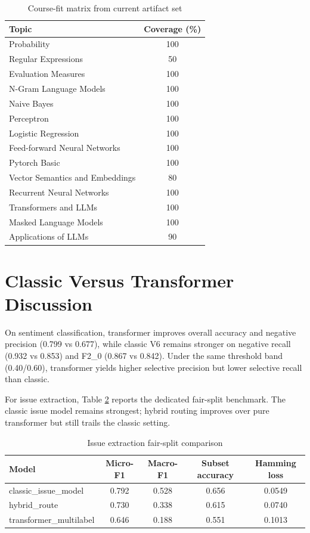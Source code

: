 \documentclass[12pt,a4paper]{article}
\begin{document}
\begin{table}[H]
\centering
\caption{Course-fit matrix from current artifact set}
\label{tab:course_fit}
\begin{tabular}{lc}
\toprule
Topic & Coverage (\%) \\
\midrule
Probability & 100 \\
Regular Expressions & 50 \\
Evaluation Measures & 100 \\
N-Gram Language Models & 100 \\
Naive Bayes & 100 \\
Perceptron & 100 \\
Logistic Regression & 100 \\
Feed-forward Neural Networks & 100 \\
Pytorch Basic & 100 \\
Vector Semantics and Embeddings & 80 \\
Recurrent Neural Networks & 100 \\
Transformers and LLMs & 100 \\
Masked Language Models & 100 \\
Applications of LLMs & 90 \\
\bottomrule
\end{tabular}
\end{table}

\section{Classic Versus Transformer Discussion}
On sentiment classification, transformer improves overall accuracy and negative precision (0.799 vs 0.677), while classic V6 remains stronger on negative recall (0.932 vs 0.853) and F2\_0 (0.867 vs 0.842). Under the same threshold band (0.40/0.60), transformer yields higher selective precision but lower selective recall than classic.

For issue extraction, Table \ref{tab:issue_fair} reports the dedicated fair-split benchmark. The classic issue model remains strongest; hybrid routing improves over pure transformer but still trails the classic setting.

\begin{table}[H]
\centering
\caption{Issue extraction fair-split comparison}
\label{tab:issue_fair}
\begin{tabular}{lcccc}
\toprule
Model & Micro-F1 & Macro-F1 & Subset accuracy & Hamming loss \\
\midrule
classic\_issue\_model & 0.792 & 0.528 & 0.656 & 0.0549 \\
hybrid\_route & 0.730 & 0.338 & 0.615 & 0.0740 \\
transformer\_multilabel & 0.646 & 0.188 & 0.551 & 0.1013 \\
\bottomrule
\end{tabular}
\end{table}
\end{document}

